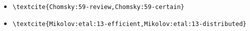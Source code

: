\begin{itemize}
\item \verb=\textcite{Chomsky:59-review,Chomsky:59-certain}= \newline \textcite{Chomsky:59-review,Chomsky:59-certain}
\item \verb=\textcite{Mikolov:etal:13-efficient,Mikolov:etal:13-distributed}= \newline \textcite{Mikolov:etal:13-efficient,Mikolov:etal:13-distributed}
\end{itemize}



\newpage
 
\printbibliography 



